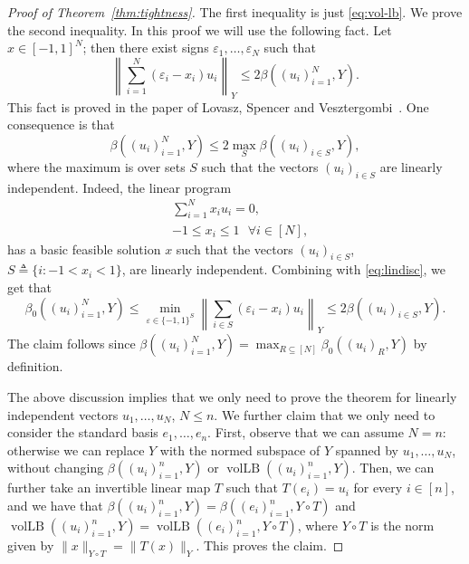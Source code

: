 \documentclass{article}
\newcommand\eps{\varepsilon}
\newcommand{\eqdef}{\triangleq}
\DeclareMathOperator{\vollb}{volLB}
\begin{document}
\begin{proof}[Proof of Theorem~\ref{thm:tightness}]
  The first inequality is just \eqref{eq:vol-lb}. We prove the second
  inequality. In this proof we will use the following
  fact. Let $x \in [-1, 1]^N$; then there exist signs $\eps_1, \ldots,
  \eps_N$ such that  
  \begin{equation}\label{eq:lindisc}
  \left\|\sum_{i = 1}^N{(\eps_i - x_i) u_i} \right\|_Y
  \le 
  2 \beta((u_i)_{i = 1}^N, Y).
  \end{equation}
  This fact is proved in the paper of Lovasz, Spencer and
  Vesztergombi~\cite{LSV}. One consequence is that
  \[
  \beta((u_i)_{i=1}^N, Y) \le 2 \max_S \beta((u_i)_{i \in S}, Y),
  \]
  where the maximum is over sets $S$ such that the vectors $(u_i)_{i \in S}$ 
  are linearly independent. Indeed, the linear program
  \begin{align*}
    &\sum_{i = 1}^N x_i u_i = 0,\\
    &-1 \le x_i \le 1 \ \ \ \forall i \in [N],
  \end{align*}
  has a basic feasible solution $x$ such that the vectors $(u_i)_{i \in
    S}$, $S \eqdef \{i: -1 <  x_i < 1\}$, are linearly independent.
  Combining with \eqref{eq:lindisc}, we get that 
  \[
  \beta_0((u_i)_{i = 1}^N, Y) 
  \le 
  \min_{\eps \in \{-1, 1\}^S} \left\| \sum_{i \in S}{(\eps_i -  x_i)u_i}\right\|_Y
  \le 
  2 \beta((u_i)_{i \in S}, Y).
  \]
  The claim follows since $\beta((u_i)_{i = 1}^N, Y) = \max_{R
    \subseteq [N]}{\beta_0((u_i)_R, Y)}$ by definition. 

  The above discussion implies that we only need to prove the theorem
  for linearly independent vectors $u_1, \ldots, u_N$,  $N \le n$.  We further
  claim that we only need to consider the standard basis $e_1, \ldots,
  e_n$. First, observe that we can assume $N = n$: otherwise we can
  replace $Y$ with the normed subspace of $Y$ spanned by $u_1, \ldots,
  u_N$, without changing $\beta((u_i)_{i = 1}^n, Y)$ or
  $\vollb((u_i)_{i = 1}^n, Y)$. Then, we can further take an
  invertible linear map $T$ such that $T(e_i) = u_i$ for every $i \in
  [n]$, and we have that $\beta((u_i)_{i = 1}^n, Y) = \beta((e_i)_{i =
    1}^n, Y \circ T)$ and $\vollb((u_i)_{i = 1}^n, Y) =
  \vollb((e_i)_{i = 1}^n, Y \circ T)$, where $Y\circ T$ is the norm
  given by $\|x\|_{Y \circ T} = \|T(x)\|_Y$. This proves the claim.


\end{proof}
\end{document}
